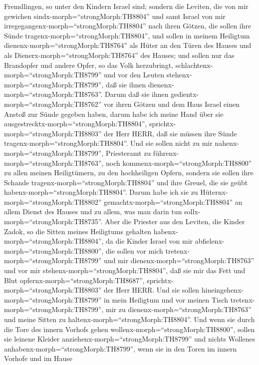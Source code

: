 Fremdlingen, so unter den Kindern Israel sind;  sondern die
Leviten, die von mir gewichen sindx-morph=``strongMorph:TH8804'' und
samt Israel von mir irregegangenx-morph=``strongMorph:TH8804'' nach
ihren Götzen, die sollen ihre Sünde
tragenx-morph=``strongMorph:TH8804'',  und sollen in meinem
Heiligtum dienenx-morph=``strongMorph:TH8764'' als Hüter an den Türen
des Hauses und als Dienerx-morph=``strongMorph:TH8764'' des Hauses; und
sollen nur das Brandopfer und andere Opfer, so das Volk herzubringt,
schlachtenx-morph=``strongMorph:TH8799'' und vor den Leuten
stehenx-morph=``strongMorph:TH8799'', daß sie ihnen
dienenx-morph=``strongMorph:TH8763''.  Darum daß sie ihnen
gedientx-morph=``strongMorph:TH8762'' vor ihren Götzen und dem Haus
Israel einen Anstoß zur Sünde gegeben haben, darum habe ich meine Hand
über sie ausgestrecktx-morph=``strongMorph:TH8804'',
sprichtx-morph=``strongMorph:TH8803'' der Herr HERR, daß sie müssen ihre
Sünde tragenx-morph=``strongMorph:TH8804''.  Und sie sollen
nicht zu mir nahenx-morph=``strongMorph:TH8799'', Priesteramt zu
führenx-morph=``strongMorph:TH8763'', noch
kommenx-morph=``strongMorph:TH8800'' zu allen meinen Heiligtümern, zu
den hochheiligen Opfern, sondern sie sollen ihre Schande
tragenx-morph=``strongMorph:TH8804'' und ihre Greuel, die sie geübt
habenx-morph=``strongMorph:TH8804''.  Darum habe ich sie zu
Hüternx-morph=``strongMorph:TH8802''
gemachtx-morph=``strongMorph:TH8804'' an allem Dienst des Hauses und zu
allem, was man darin tun sollx-morph=``strongMorph:TH8735''.
 Aber die Priester aus den Leviten, die Kinder Zadok, so
die Sitten meines Heiligtums gehalten
habenx-morph=``strongMorph:TH8804'', da die Kinder Israel von mir
abfielenx-morph=``strongMorph:TH8800'', die sollen vor mich
tretenx-morph=``strongMorph:TH8799'' und mir
dienenx-morph=``strongMorph:TH8763'' und vor mir
stehenx-morph=``strongMorph:TH8804'', daß sie mir das Fett und Blut
opfernx-morph=``strongMorph:TH8687'',
sprichtx-morph=``strongMorph:TH8803'' der Herr HERR.  Und
sie sollen hineingehenx-morph=``strongMorph:TH8799'' in mein Heiligtum
und vor meinen Tisch tretenx-morph=``strongMorph:TH8799'', mir zu
dienenx-morph=``strongMorph:TH8763'' und meine Sitten zu
haltenx-morph=``strongMorph:TH8804''.  Und wenn sie durch
die Tore des innern Vorhofs gehen wollenx-morph=``strongMorph:TH8800'',
sollen sie leinene Kleider anziehenx-morph=``strongMorph:TH8799'' und
nichts Wollenes anhabenx-morph=``strongMorph:TH8799'', wenn sie in den
Toren im innern Vorhofe und im Hause
